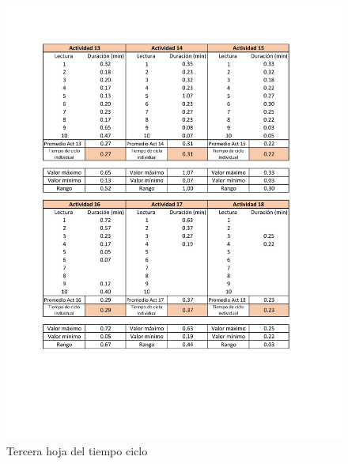     \begin{figure}[H]
        \centering
        \includegraphics[trim = {1mm 1mm 1mm 1mm},clip,scale=0.45]{34/img/tiempoCicloEnsamble10Lecturas3.pdf}
        \caption{Tercera hoja del tiempo ciclo}
        \label{fig:tiempoCicloEnsamble10Lecturas3}
    \end{figure}
